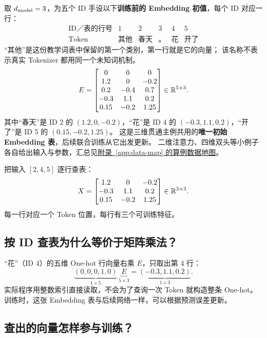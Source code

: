 取 $d_{\rm model}=3$，为五个 ID 手设以下\textbf{训练前的 Embedding 初值}，每个 ID 对应一行：
\[
\begin{array}{c|ccccc}
\text{ID／表的行号}&1&2&3&4&5\\\hline
\text{Token}&\text{其他}&\text{春天}&\text{。}&\text{花}&\text{开了}
\end{array}
\]
“其他”是这份教学词表中保留的第一个类别，第一行就是它的向量；
该名称不表示真实 Tokenizer 都用同一个未知词机制。
\[
E=\begin{bmatrix}
0&0&0\\
1.2&0&-0.2\\
0.2&-0.4&0.7\\
-0.3&1.1&0.2\\
0.15&-0.2&1.25
\end{bmatrix}\in\mathbb{R}^{5\times3}.
\]
其中“春天”是 ID 2 的 $(1.2,0,-0.2)$，“花”是 ID 4 的
$(-0.3,1.1,0.2)$，“开了”是 ID 5 的 $(0.15,-0.2,1.25)$。
这是三维贯通主例共用的\textbf{唯一初始 Embedding 表}，后续联合训练从它出发更新。
二维注意力、四维双头等小例子各自给出输入与参数，汇总见\hyperref[app:data-map]{附录~\ref*{app:data-map} 的算例数据地图}。

把输入 $[2,4,5]$ 逐行查表：
\begin{equation}
\boxed{
X=\begin{bmatrix}
1.2&0&-0.2\\
-0.3&1.1&0.2\\
0.15&-0.2&1.25
\end{bmatrix}\in\R^{3\times3}.
}
\label{eq:running-embedding}
\end{equation}
每一行对应一个 Token 位置，每行有三个可训练特征。



\subsection{按 ID 查表为什么等价于矩阵乘法？}

“花”（ID 4）的五维 One-hot 行向量右乘 $E$，只取出第 4 行：
\[
\underbrace{(0,0,0,1,0)}_{1\times5}\,
\underbrace{E}_{5\times3}
=\underbrace{(-0.3,1.1,0.2)}_{1\times3}.
\]
实际程序用整数索引直接读取，不会为了查询一次 Token 就构造整条 One-hot。
训练时，这张 Embedding 表与后续网络一样，可以根据预测误差更新。

\subsection{查出的向量怎样参与训练？}

